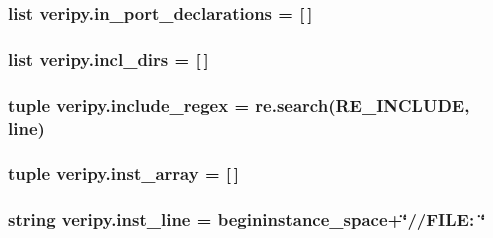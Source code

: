 \hypertarget{namespaceveripy_a1d80c92b030a306a025b82c2f229acac}{
\subsubsection[{in\-\_\-port\-\_\-declarations}]{\setlength{\rightskip}{0pt plus 5cm}list veripy.\-in\-\_\-port\-\_\-declarations = \mbox{[}$\,$\mbox{]}}}\label{namespaceveripy_a1d80c92b030a306a025b82c2f229acac}
\hypertarget{namespaceveripy_a7d5b541d0e30b5abbc5760e3ea7b4da2}{
\subsubsection[{incl\-\_\-dirs}]{\setlength{\rightskip}{0pt plus 5cm}list veripy.\-incl\-\_\-dirs = \mbox{[}$\,$\mbox{]}}}\label{namespaceveripy_a7d5b541d0e30b5abbc5760e3ea7b4da2}
\hypertarget{namespaceveripy_a67e40ea20ac72f86e578403f7e1e3e22}{
\subsubsection[{include\-\_\-regex}]{\setlength{\rightskip}{0pt plus 5cm}tuple veripy.\-include\-\_\-regex = re.\-search(R\-E\-\_\-\-I\-N\-C\-L\-U\-D\-E, {\bf line})}}\label{namespaceveripy_a67e40ea20ac72f86e578403f7e1e3e22}
\hypertarget{namespaceveripy_a1be2f445d115897ce46823d58aff90c6}{
\subsubsection[{inst\-\_\-array}]{\setlength{\rightskip}{0pt plus 5cm}tuple veripy.\-inst\-\_\-array = \mbox{[}$\,$\mbox{]}}}\label{namespaceveripy_a1be2f445d115897ce46823d58aff90c6}
\hypertarget{namespaceveripy_a8f89f48fcf9323bd5bb9de7d5656a783}{
\subsubsection[{inst\-\_\-line}]{\setlength{\rightskip}{0pt plus 5cm}string veripy.\-inst\-\_\-line = {\bf begininstance\-\_\-space}+\char`\"{}//F\-I\-L\-E\-: \char`\"{}}}\label{namespaceveripy_a8f89f48fcf9323bd5bb9de7d5656a783}


